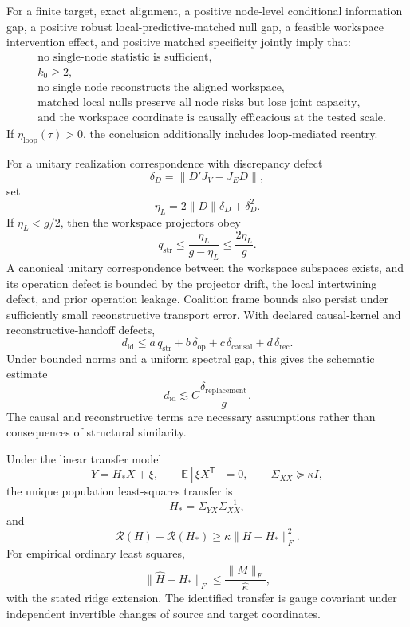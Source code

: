 
For a finite target, exact alignment, a positive node-level conditional
information gap, a positive robust local-predictive-matched null gap, a feasible
workspace intervention effect, and positive matched specificity jointly imply
that:
\[
\begin{aligned}
&\text{no single-node statistic is sufficient},\\
&k_0\geq2,\\
&\text{no single node reconstructs the aligned workspace},\\
&\text{matched local nulls preserve all node risks but lose joint capacity},\\
&\text{and the workspace coordinate is causally efficacious at the tested scale.}
\end{aligned}
\]
If \(\eta_{\mathrm{loop}}(\tau)>0\), the conclusion additionally includes
loop-mediated reentry.


For a unitary realization correspondence with discrepancy defect
\[
\delta_D=\|D'J_V-J_ED\|,
\]
set
\[
\eta_L=2\|D\|\delta_D+\delta_D^2.
\]
If \(\eta_L<g/2\), then the workspace projectors obey
\[
\boxed{
q_{\mathrm{str}}
\leq
\frac{\eta_L}{g-\eta_L}
\leq
\frac{2\eta_L}{g}.
}
\]
A canonical unitary correspondence between the workspace subspaces exists,
and its operation defect is bounded by the projector drift, the local
intertwining defect, and prior operation leakage. Coalition frame bounds also
persist under sufficiently small reconstructive transport error. With declared
causal-kernel and reconstructive-handoff defects,
\[
\boxed{
d_{\mathrm{id}}
\leq
 a\,q_{\mathrm{str}}
+b\,\delta_{\mathrm{op}}
+c\,\delta_{\mathrm{causal}}
+d\,\delta_{\mathrm{rec}}.
}
\]
Under bounded norms and a uniform spectral gap, this gives the schematic
estimate
\[
d_{\mathrm{id}}
\lesssim
C\frac{\delta_{\mathrm{replacement}}}{g}.
\]
The causal and reconstructive terms are necessary assumptions rather than
consequences of structural similarity.



Under the linear transfer model
\[
Y=H_*X+\xi,
\qquad
\mathbb E[\xi X^{\mathsf T}]=0,
\qquad
\Sigma_{XX}\succeq\kappa I,
\]
the unique population least-squares transfer is
\[
\boxed{H_*=\Sigma_{YX}\Sigma_{XX}^{-1},}
\]
and
\[
\mathcal R(H)-\mathcal R(H_*)
\geq
\kappa\|H-H_*\|_F^2.
\]
For empirical ordinary least squares,
\[
\|\widehat H-H_*\|_F
\leq
\frac{\|\widehat M\|_F}{\widehat\kappa},
\]
with the stated ridge extension. The identified transfer is gauge covariant
under independent invertible changes of source and target coordinates.

